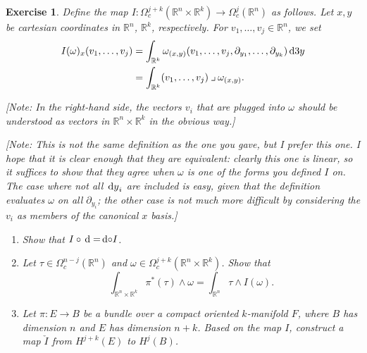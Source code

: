 \documentclass{article}
\newtheorem{ex}{Exercise}
\theoremstyle{nonumberplain}
\newcommand{\R}{\mathbb{R}}
\newcommand{\into}{\mathbin{\lrcorner}}
\begin{document}
\begin{ex}
Define the map $I \colon \Omega^{j+k}_c(\R^n \times \R^k) \to \Omega^j_c (\R^n)$ as follows. Let $x, y$ be cartesian coordinates in $\R^n$, $\R^k$, respectively. For $v_1, \dots, v_j \in \R^n$, we set
\begin{align*}
I(\omega)_x(v_1, \dots, v_j) &= \int_{\R^k} \omega_{(x,y)}(v_1, \dots, v_j, \partial_{y_1}, \dots, \partial_{y_k}) \dl3 y\\
&= \int_{\R^k} (v_1, \dots, v_j) \into \omega_{(x,y)}.
\end{align*}

[Note: In the right-hand side, the vectors $v_i$ that are plugged into $\omega$ should be understood as vectors in $\R^n \times \R^k$ in the obvious way.]

[Note: This is not the same definition as the one you gave, but I prefer this one. I hope that it is clear enough that they are equivalent: clearly this one is linear, so it suffices to show that they agree when $\omega$ is one of the forms you defined $I$ on. The case where not all $\dl y_i$ are included is easy, given that the definition evaluates $\omega$ on all $\partial_{y_i}$; the other case is not much more difficult by considering the $v_i$ as members of the canonical $x$ basis.]

\begin{enumerate}
\item Show that $I \circ \dl = \dl \circ I$.

\item Let $\tau \in \Omega^{n-j}_c(\R^n)$ and $\omega \in \Omega^{j+k}_c(\R^n \times \R^k)$. Show that
\[\int_{\R^n \times \R^k} \pi^*(\tau) \wedge \omega = \int_{\R^n} \tau \wedge I(\omega).\]

\item Let $\pi \colon E \to B$ be a bundle over a compact \emph{oriented} $k$-manifold $F$, where $B$ has dimension $n$ and $E$ has dimension $n+k$. Based on the map $I$, construct a map $\check I$ from $H^{j+k}(E)$ to $H^j(B)$.
\end{enumerate}
\end{ex}
\end{document}
